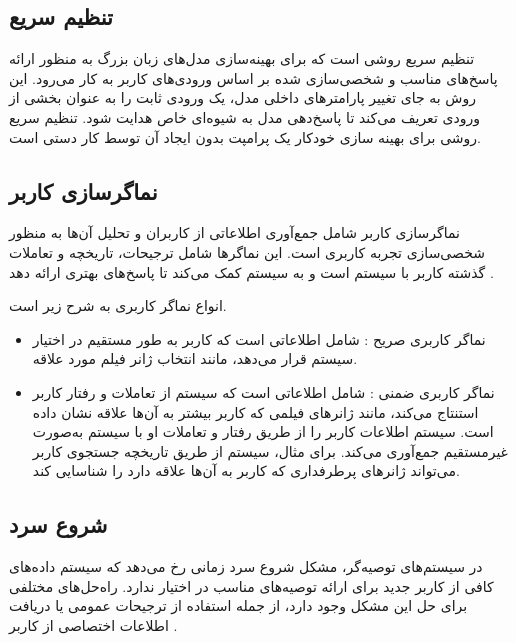 \subsection{تنظیم سریع}
 تنظیم سریع
 روشی است که برای بهینه‌سازی مدل‌های زبان بزرگ به منظور ارائه پاسخ‌های مناسب و شخصی‌سازی شده بر اساس ورودی‌های کاربر به کار می‌رود. این روش به جای تغییر پارامترهای داخلی مدل، یک ورودی%
 ثابت را به عنوان بخشی از ورودی تعریف می‌کند تا پاسخ‌دهی مدل به شیوه‌ای خاص هدایت شود. تنظیم سریع روشی برای بهینه سازی خودکار یک پرامپت بدون ایجاد آن توسط کار دستی است.%
\cite{kasahara2022building}


\subsection{نماگر‌سازی کاربر}

نماگر‌سازی کاربر%
 شامل جمع‌آوری اطلاعاتی از کاربران و تحلیل آن‌ها به منظور شخصی‌سازی تجربه کاربری است. این نماگر‌ها شامل ترجیحات، تاریخچه و تعاملات گذشته کاربر با سیستم است و به سیستم کمک می‌کند تا پاسخ‌های بهتری ارائه دهد %
\cite{shanaz2020potential}
.

انواع نماگر کاربری به شرح زیر است.
\begin{itemize}
\item
نماگر کاربری صریح%
: شامل اطلاعاتی است که کاربر به طور مستقیم در اختیار سیستم قرار می‌دهد، مانند انتخاب ژانر فیلم مورد علاقه.
\item
نماگر کاربری ضمنی%
: شامل اطلاعاتی است که سیستم از تعاملات و رفتار کاربر استنتاج می‌کند، مانند ژانرهای فیلمی که کاربر بیشتر به آن‌ها علاقه نشان داده است. سیستم اطلاعات کاربر را از طریق رفتار و تعاملات او با سیستم به‌صورت غیرمستقیم جمع‌آوری می‌کند. برای مثال، سیستم از طریق تاریخچه جستجوی کاربر می‌تواند ژانرهای پرطرفداری که کاربر به آن‌ها علاقه دارد را شناسایی کند.
\end{itemize}

\subsection{شروع سرد}

در سیستم‌های توصیه‌گر، مشکل 
شروع سرد%
 زمانی رخ می‌دهد که سیستم داده‌های کافی از کاربر جدید برای ارائه توصیه‌های مناسب در اختیار ندارد. راه‌حل‌های مختلفی برای حل این مشکل وجود دارد، از جمله استفاده از ترجیحات عمومی یا دریافت اطلاعات اختصاصی از کاربر %
\cite{yuan2023user}
.


